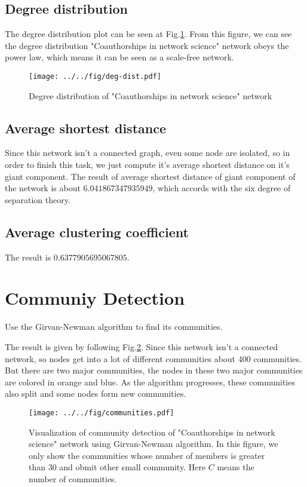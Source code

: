 \documentclass[runningheads]{llncs}
\begin{document}
\subsection{Degree distribution}

The degree distribution plot can be seen at Fig.\ref{fig:deg-dist}.
From this figure, we can see the degree distribution "Coauthorships in network science" network obeys
the power law, which means it can be seen as a scale-free network.

\begin{figure}
    \centering
    \texttt{[image: ../../fig/deg-dist.pdf]}
    \caption{Degree distribution of "Coauthorships in network science" network} 
    \label{fig:deg-dist}
\end{figure}

\subsection{Average shortest distance}

Since this network isn't a connected graph, even some node are isolated,
so in order to finish this task, we just compute it's average shortest distance on it's giant component.
The result of average shortest distance of giant component of the network is about $6.041867347935949$,
which accords with the six degree of separation theory.

\subsection{Average clustering coefficient}

The result is $0.6377905695067805$.

\section{Communiy Detection}

Use the Girvan-Newman algorithm\cite{ref:gn-algo} to find its communities.

The result is given by following Fig.\ref{fig:community}. 
Since this network isn't a connected network, so nodes get into a lot of different communities about 400
communities. But there are two major communities, the nodes in these two major communities are colored in orange and blue.
As the algorithm progresses, these communities also split and some nodes form new communities.

\begin{figure}
    \centering
    \texttt{[image: ../../fig/communities.pdf]}
    \caption{Visualization of community detection of "Coauthorships in network science" network using Girvan-Newman algorithm. 
    In this figure, we only show the communities whose number of members is greater than 30 and obmit other small community. 
    Here $C$ means the number of communities.} 
    \label{fig:community}
\end{figure}
\end{document}
